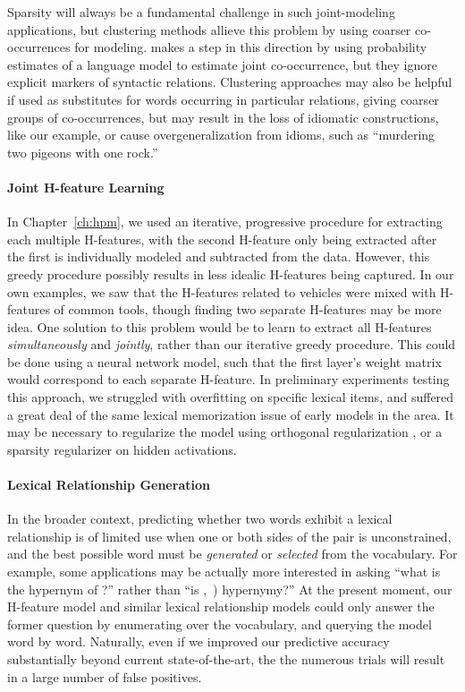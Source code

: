 Sparsity will always be a fundamental challenge in such joint-modeling
applications, but clustering methods allieve this problem by using coarser
co-occurrences for modeling.   makes a step in this
direction by using probability estimates of a language model to estimate joint
co-occurrence, but they ignore explicit markers of syntactic relations.
Clustering approaches may also be helpful if used as substitutes for words
occurring in particular relations, giving coarser groups of co-occurrences,
but may result in the loss of idiomatic constructions, like our example, or
cause overgeneralization from idioms, such as ``murdering two pigeons with one
rock.''

\paragraph{Joint H-feature Learning}

In Chapter~\ref{ch:hpm}, we used an iterative, progressive procedure for
extracting each multiple H-features, with the second H-feature only being
extracted after the first is individually modeled and subtracted from the data.
However, this greedy procedure possibly results in less idealic H-features
being captured. In our own examples, we saw that the H-features related to
vehicles were mixed with H-features of common tools, though finding two
separate H-features may be more idea. One solution to this problem would be
to learn to extract all H-features {\em simultaneously} and {\em jointly},
rather than our iterative greedy procedure. This could be done using a
neural network model, such that the first layer's weight matrix would
correspond to each separate H-feature. In preliminary experiments testing this
approach, we struggled with overfitting on specific lexical items, and suffered
a great deal of the same lexical memorization issue of early models in the
area. It may be necessary to regularize the model using orthogonal
regularization \cite{brock:2017:iclr}, or a sparsity regularizer on hidden
activations.

\paragraph{Lexical Relationship Generation}

In the broader context, predicting whether two words exhibit a lexical
relationship is of limited use when one or both sides of the pair
is unconstrained, and the best possible word must be {\em generated} or
{\em selected} from the vocabulary. For example, some applications may be
actually more interested in asking ``what is the hypernym of ?'' rather
than ``is ,~) hypernymy?'' At the present moment, our
H-feature model and similar lexical relationship models could only answer the
former question by enumerating over the vocabulary, and querying the model word
by word. Naturally, even if we improved our predictive accuracy substantially
beyond current state-of-the-art, the the numerous trials will result
in a large number of false positives.

